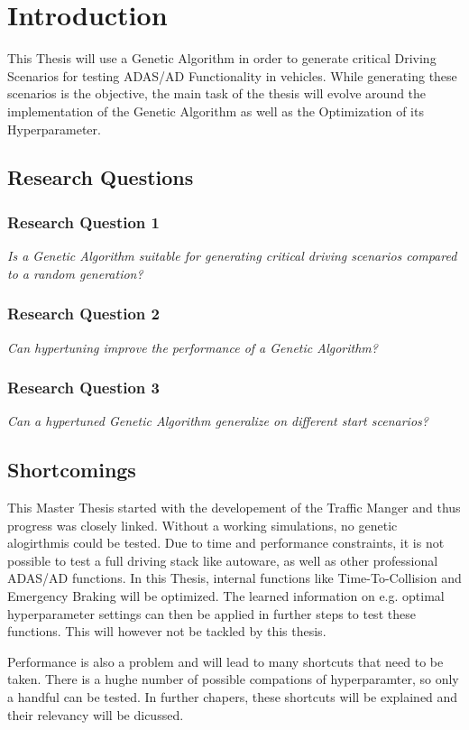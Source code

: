 \chapter{Introduction}
This Thesis will use a Genetic Algorithm in order to generate critical Driving Scenarios for testing ADAS/AD Functionality in vehicles.
While generating these scenarios is the objective, the main task of the thesis will evolve around the implementation of the Genetic Algorithm as well as the Optimization of its Hyperparameter.


\section{Research Questions}
\subsection{Research Question 1}
\textit{Is a Genetic Algorithm suitable for generating critical driving scenarios compared to a random generation?}

\subsection{Research Question 2}
\textit{Can hypertuning improve the performance of a Genetic Algorithm?}

\subsection{Research Question 3}
\textit{Can a hypertuned Genetic Algorithm generalize on different start scenarios?}


\section{Shortcomings}
This Master Thesis started with the developement of the Traffic Manger and thus progress was closely linked. Without a working simulations, no genetic alogirthmis could be tested. Due to time and performance constraints, it is not possible to test a full driving stack like autoware, as well as other professional ADAS/AD functions.
In this Thesis, internal functions like Time-To-Collision and Emergency Braking will be optimized. The learned  information on e.g. optimal hyperparameter settings can then be applied in further steps to test these functions. This will however not be tackled by this thesis.

Performance is also a problem and will lead to many shortcuts that need to be taken. There is a hughe number of possible compations of hyperparamter, so only a handful can be tested. In further chapers, these shortcuts will be explained and their relevancy will be dicussed.